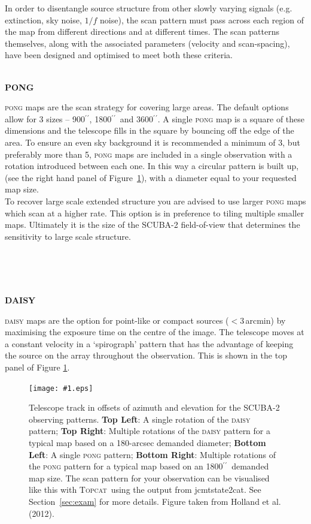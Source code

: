 \documentclass[twoside,11pt]{article}
\newcommand{\htmladdnormallink}[2]{#1}
\newcommand{\htmladdimg}[1]{}
\newcommand{\xref}[3]{#1}
\renewcommand{\_}{\texttt{\symbol{95}}}
\newcommand{\myfig}[5]{
  \begin{figure}#2
    \centering\texttt{[image: \#1.eps]}
    \typeout{#1.eps inserted on page \arabic{page}}
    \caption{\label{#4}\small #5}
  \end{figure}
}
\newcommand{\myfig}[5]{
    \label{#4} \htmladdimg{#1.png}\\
    \\
    Figure: #5\\
  }
\newcommand{\arcmin}{\mbox{$^\prime$}}
\newcommand{\arcsec}{\arcmin\hspace*{-0.1em}\arcmin}
\newcommand{\topcat}{\htmladdnormallink{\textsc{Topcat}}{http://www.starlink.ac.uk/topcat}}
\newcommand{\task}[1]{\textsf{#1}}
\newcommand{\jcmtstate}{\xref{\task{jcmtstate2cat}}{sun258}{JCMTSTATE2CAT}}
\begin{document}
In order to disentangle source structure from other
slowly varying signals (e.g. extinction, sky noise, $1/f$ noise), the
scan pattern must pass across each region of the map from different
directions and at different times. The scan patterns themselves, along
with the associated parameters (velocity and scan-spacing), have been
designed and optimised to meet both these criteria.
\\ \\
\begin{minipage}[t]{0.12\linewidth}
\textbf{PONG}
\end{minipage}
\begin{minipage}[t]{0.85\linewidth}\textsc{pong} maps are the scan
strategy for covering large areas. The default options allow for 3
sizes -- 900\arcsec, 1800\arcsec\ and 3600\arcsec. A single \textsc{pong} map is
a square of these dimensions and the telescope fills in the square by
bouncing off the edge of the area. To ensure an even sky background it
is recommended a minimum of 3, but preferably more than 5,
\textsc{pong} maps are included in a single observation with a
rotation introduced between each one. In this way a circular pattern
is built up, (see the right hand panel of Figure~\ref{fig:scan}), with
a diameter equal to your requested map size.
\vspace{0.2cm}\\
To recover large scale extended structure you are advised to use
larger \textsc{pong} maps which scan at a higher rate. This option is
in preference to tiling multiple smaller maps. Ultimately it is the
size of the SCUBA-2 field-of-view that determines the sensitivity to
large scale structure.
\end{minipage}
\\ \\ \\
\begin{minipage}[t]{0.12\linewidth}
\textbf{DAISY}
\end{minipage}
\begin{minipage}[t]{0.85\linewidth}
\textsc{daisy} maps are the option for point-like or compact sources
($<$3\,arcmin) by maximising the exposure time on the centre of the
image. The telescope moves at a constant velocity in a `spirograph'
pattern that has the advantage of keeping the source on the array
throughout the observation. This is shown in the top panel of Figure
\ref{fig:scan}.
\end{minipage}

\myfig{sc21_wayne_scan}{[b!]}{width=0.9\linewidth}{fig:scan}{
  Telescope track in offsets of azimuth and elevation for the SCUBA-2
  observing patterns. \textbf{Top Left}: A single rotation of the
  \textsc{daisy} pattern; \textbf{Top Right}: Multiple rotations of
  the \textsc{daisy} pattern for a typical map based on a 180-arcsec
  demanded diameter; \textbf{Bottom Left}: A single \textsc{pong}
  pattern; \textbf{Bottom Right}: Multiple rotations of the
  \textsc{pong} pattern for a typical map based on an 1800\arcsec\
  demanded map size. The scan pattern for your observation can be
  visualised like this with \topcat\ using the output from \jcmtstate.
  See Section~\ref{sec:exam} for more details. Figure taken from
  Holland et al. (2012).}
\end{document}
